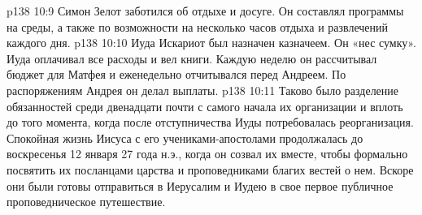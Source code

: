 \vs p138 10:9 \pc {}\bibnobreakspace Симон Зелот заботился об отдыхе и досуге. Он составлял программы на среды, а также по возможности на несколько часов отдыха и развлечений каждого дня.
\vs p138 10:10 \pc {}\bibnobreakspace Иуда Искариот был назначен казначеем. Он «нес сумку». Иуда оплачивал все расходы и вел книги. Каждую неделю он рассчитывал бюджет для Матфея и еженедельно отчитывался перед Андреем. По распоряжениям Андрея он делал выплаты.
\vs p138 10:11 \pc Таково было разделение обязанностей среди двенадцати почти с самого начала их организации и вплоть до того момента, когда после отступничества Иуды потребовалась реорганизация. Спокойная жизнь Иисуса с его учениками\hyp{}апостолами продолжалась до воскресенья 12 января 27 года н.э., когда он созвал их вместе, чтобы формально посвятить их посланцами царства и проповедниками благих вестей о нем. Вскоре они были готовы отправиться в Иерусалим и Иудею в свое первое публичное проповедническое путешествие.
